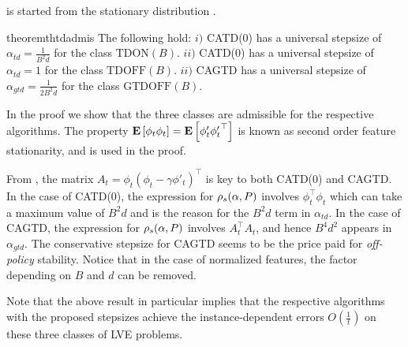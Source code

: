 is started from the stationary distribution \cite{su88}. 
\FloatBarrier
\begin{table}[h]
\caption{Here, $S,A,\gamma$ are fixed across all the class and the second column shows the quantities that vary across the respective classes. These three capture \emph{on/off-policy} learning scenarios arising in RL.}
\end{table}
\fi
\begin{restatable}{theorem}{thtdadmis}\label{th:tdadmis}
The following hold:
$i)$ CATD(0) has a universal stepsize of $\alpha_{td}=\frac{1}{B^2d}$ for  the class $\text{TDON}(B)$.
$ii)$ CATD(0) has a universal stepsize of $\alpha_{td}=1$ for  the class $\text{TDOFF}(B)$.
$ii)$ CAGTD has a universal stepsize of $\alpha_{gtd}=\frac{1}{2B^2d}$ for the class $\text{GTDOFF}(B)$.
\end{restatable}
In the proof we show that the three classes are admissible for the respective algorithms.
The property $\mathbf{E}\left[\phi_t\phi_t\right]=\mathbf{E}\left[\phi'_t{\phi'_t}^\top\right]$ is known as second order feature stationarity, and is used in the proof.
\fi

From , the matrix $A_t=\phi_t(\phi_t-\gamma\phi'_t)^\top$ is key to both CATD(0) and CAGTD. In the case of CATD(0),  the expression for $\rho_s(\alpha,P)$ involves $\phi^\top_t\phi_t$ which can take a maximum value of $B^2d$  and is the reason for the $B^2d$ term in $\alpha_{td}$. In the case of CAGTD, the expression for $\rho_s(\alpha,P)$ involves $A_t^\top A_t$, and hence $B^4d^2$ appears in $\alpha_{gtd}$. 
The conservative stepsize for CAGTD seems to be the price paid for \emph{off-policy} stability. Notice that in the case of normalized features, the factor depending on $B$ and $d$ can be removed.

Note that the above result in particular implies that the respective algorithms with the proposed stepsizes achieve the instance-dependent errors $O(\frac{1}{t})$ on these three classes of LVE problems.

